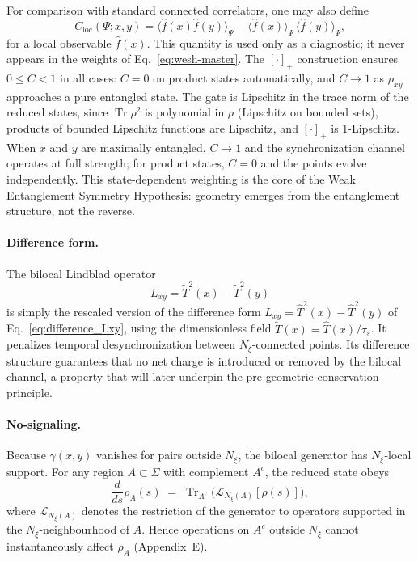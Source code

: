 \documentclass[12pt,a4paper]{article}
\renewcommand{\Tr}{\operatorname{Tr}}
\numberwithin{equation}{section}
\begin{document}
\vspace{0.3cm}
\noindent For comparison with standard connected correlators, one may also define
\begin{equation}
C_{\text{loc}}(\Psi;x,y)
= \langle \hat{f}(x)\hat{f}(y)\rangle_\Psi
 - \langle \hat{f}(x)\rangle_\Psi\,\langle \hat{f}(y)\rangle_\Psi,
\label{eq:local-correlator}
\end{equation}
for a local observable $\hat f(x)$. This quantity is used only as a
diagnostic; it never appears in the weights of
Eq.~\eqref{eq:wesh-master}. The $[\cdot]_+$ construction ensures $0\leq C < 1$ in all cases: $C=0$ on product states automatically, and $C\to 1$ as $\rho_{xy}$ approaches a pure entangled state. The gate is Lipschitz in the trace norm of the reduced states, since $\Tr\rho^2$ is polynomial in $\rho$ (Lipschitz on bounded sets), products of bounded Lipschitz functions are Lipschitz, and $[\cdot]_+$ is $1$-Lipschitz. When $x$ and $y$ are maximally entangled,
$C \to 1$ and the synchronization channel operates at full strength; for
product states, $C = 0$ and the points evolve independently. This
state-dependent weighting is the core of the Weak Entanglement Symmetry
Hypothesis: geometry emerges from the entanglement structure, not the
reverse.

\paragraph{Difference form.}
The bilocal Lindblad operator
\begin{equation}
L_{xy} = \tilde{T}^2(x) - \tilde{T}^2(y)
\label{eq:Lxy-rescaled}
\end{equation}
is simply the rescaled version of the difference form
$L_{xy} = \hat{T}^2(x) - \hat{T}^2(y)$ of Eq.~\eqref{eq:difference_Lxy},
using the dimensionless field $\tilde{T}(x)=\hat{T}(x)/\tau_s$.
It penalizes temporal desynchronization between $N_\xi$-connected points. Its difference structure guarantees that no net charge is introduced or removed by the bilocal channel, 
a property that will later underpin the pre-geometric conservation principle.

\paragraph{No-signaling.}
Because $\gamma(x,y)$ vanishes for pairs outside $N_\xi$, the bilocal generator has
$N_\xi$-local support. For any region $A\subset\Sigma$ with complement $A^c$,
the reduced state obeys
\begin{equation}
\frac{d}{ds}\rho_A(s)\;=\;\Tr_{A^c}\big(\mathcal L_{N_\xi(A)}[\rho(s)]\big),
\label{eq:no-signaling}
\end{equation}
where $\mathcal L_{N_\xi(A)}$ denotes the restriction of the generator to operators
supported in the $N_\xi$-neighbourhood of $A$. Hence operations on $A^c$ outside $N_\xi$
cannot instantaneously affect $\rho_A$ (Appendix~E).
\end{document}
